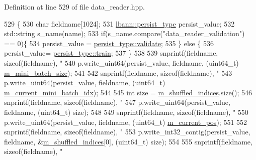 Definition at line 529 of file data\+\_\+reader.\+hpp.


\begin{DoxyCode}
529                                                   \{
530     \textcolor{keywordtype}{char} fieldname[1024];
531     \hyperlink{namespacelbann_adee41f31f15f3906cbdcce4a1417eb56}{lbann::persist\_type} persist\_value;
532     std::string s\_name(name);
533     \textcolor{keywordflow}{if}(s\_name.compare(\textcolor{stringliteral}{"data\_reader\_validation"}) == 0)\{
534       persist\_value = \hyperlink{namespacelbann_adee41f31f15f3906cbdcce4a1417eb56af9ab05454998236921a6b0e281fae632}{persist\_type::validate};
535     \} \textcolor{keywordflow}{else} \{
536        persist\_value= \hyperlink{namespacelbann_adee41f31f15f3906cbdcce4a1417eb56a61b3a8faa9c1091806675c230a9abe64}{persist\_type::train};
537     \}
538 
539     snprintf(fieldname, \textcolor{keyword}{sizeof}(fieldname), \textcolor{stringliteral}{"%
540     p.write\_uint64(persist\_value, fieldname, (uint64\_t) \hyperlink{classlbann_1_1generic__data__reader_a96f87a7d09711ab3eee3940ff2aa36ec}{m\_mini\_batch\_size});
541 
542     snprintf(fieldname, \textcolor{keyword}{sizeof}(fieldname), \textcolor{stringliteral}{"%
543     p.write\_uint64(persist\_value, fieldname, (uint64\_t) \hyperlink{classlbann_1_1generic__data__reader_aefd4bc0bf95de1e2500827581acf3536}{m\_current\_mini\_batch\_idx});
544     
545     \textcolor{keywordtype}{int} size = \hyperlink{classlbann_1_1generic__data__reader_aaab6aeff67ffff1c689336851fec2c57}{m\_shuffled\_indices}.size();
546     snprintf(fieldname, \textcolor{keyword}{sizeof}(fieldname), \textcolor{stringliteral}{"%
547     p.write\_uint64(persist\_value, fieldname, (uint64\_t) size);
548     
549     snprintf(fieldname, \textcolor{keyword}{sizeof}(fieldname), \textcolor{stringliteral}{"%
550     p.write\_uint64(persist\_value, fieldname, (uint64\_t) \hyperlink{classlbann_1_1generic__data__reader_a2facf4e410099ac8c1fa586e797ec2e0}{m\_current\_pos});
551     
552     snprintf(fieldname, \textcolor{keyword}{sizeof}(fieldname), \textcolor{stringliteral}{"%
553     p.write\_int32\_contig(persist\_value, fieldname, &\hyperlink{classlbann_1_1generic__data__reader_aaab6aeff67ffff1c689336851fec2c57}{m\_shuffled\_indices}[0], (uint64\_t) 
      size);
554     
555     snprintf(fieldname, \textcolor{keyword}{sizeof}(fieldname), \textcolor{stringliteral}{"%
}}}}}}
\end{DoxyCode}
